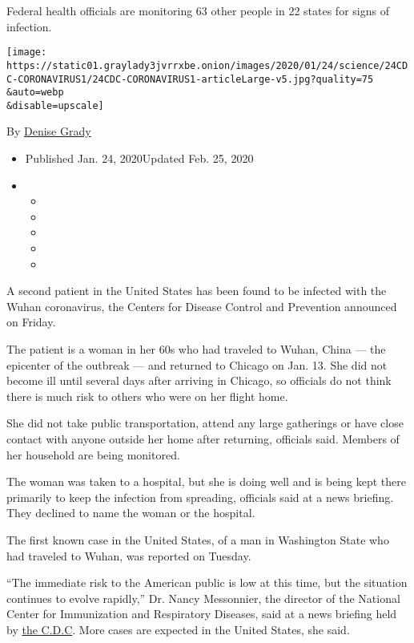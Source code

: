 Federal health officials are monitoring 63 other people in 22 states for
signs of infection.

\texttt{[image: https://static01.graylady3jvrrxbe.onion/images/2020/01/24/science/24CDC-CORONAVIRUS1/24CDC-CORONAVIRUS1-articleLarge-v5.jpg?quality=75\\\&auto=webp\\\&disable=upscale]}

By \href{https://www.nytimes3xbfgragh.onion/by/denise-grady}{Denise
Grady}

\begin{itemize}
\item
  Published Jan. 24, 2020Updated Feb. 25, 2020
\item
  \begin{itemize}
  \item
  \item
  \item
  \item
  \item
  \end{itemize}
\end{itemize}

A second patient in the United States has been found to be infected with
the Wuhan coronavirus, the Centers for Disease Control and Prevention
announced on Friday.

The patient is a woman in her 60s who had traveled to Wuhan, China ---
the epicenter of the outbreak --- and returned to Chicago on Jan. 13.
She did not become ill until several days after arriving in Chicago, so
officials do not think there is much risk to others who were on her
flight home.

She did not take public transportation, attend any large gatherings or
have close contact with anyone outside her home after returning,
officials said. Members of her household are being monitored.

The woman was taken to a hospital, but she is doing well and is being
kept there primarily to keep the infection from spreading, officials
said at a news briefing. They declined to name the woman or the
hospital.

The first known case in the United States, of a man in Washington State
who had traveled to Wuhan, was reported on Tuesday.

``The immediate risk to the American public is low at this time, but the
situation continues to evolve rapidly,'' Dr. Nancy Messonnier, the
director of the National Center for Immunization and Respiratory
Diseases, said at a news briefing held by
\href{https://www.nytimes3xbfgragh.onion/2020/02/25/health/coronavirus-united-states.html}{the
C.D.C}. More cases are expected in the United States, she said.

